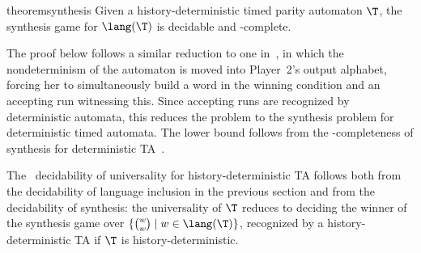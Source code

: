 \begin{restatable}{theorem}{synthesis}
    \label{thm:synthesis}
	Given a history-deterministic timed parity automaton $\T$, the synthesis game for $\lang(\T)$ is decidable and \exptime-complete.
\end{restatable}

The proof below follows a similar reduction to one in~\cite{LZ22}, in which the nondeterminism of the automaton is moved into Player~2's output alphabet, forcing her to simultaneously build a word in the winning condition and an accepting run witnessing this. Since accepting runs are recognized by deterministic automata, this reduces the problem to the synthesis problem for deterministic timed automata.	The lower bound follows from the \exptime-completeness of synthesis for deterministic TA~\cite{DM2002}.

The \exptime\ decidability of universality for history-deterministic TA follows both from the decidability of language inclusion in the previous section and from the decidability of synthesis: the universality of $\T$ reduces to deciding the winner of the synthesis game over $\{\binom{w}{w}\mid w\in \lang(\T)\}$, recognized by a history-deterministic TA if $\T$ is history-deterministic.

